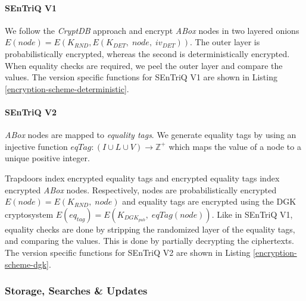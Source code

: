 %

\paragraph*{SEnTriQ V1} We follow the \emph{CryptDB} \autocite{Popa2011-zb, Popa2012-bw, Popa2011-ci} approach and encrypt \emph{ABox} nodes in two layered onions $E(node) = E(K_{RND}, E(K_{DET}, \; node, \; iv_{DET}))$. The outer layer is probabilistically encrypted, whereas the second is deterministically encrypted. When equality checks are required, we peel the outer layer and compare the values. The version specific functions for \gls{SEnTriQ} V1 are shown in Listing \ref{encryption-scheme-deterministic}.

%

\paragraph*{SEnTriQ V2} \emph{ABox} nodes are mapped to \emph{equality tags}. We generate equality tags by using an injective function $eqTag: (I \cup L \cup V) \rightarrow \mathbb{Z}^{+}$ which maps the value of a node to a unique positive integer.

Trapdoors index encrypted equality tags and encrypted equality tags index encrypted \emph{ABox} nodes. Respectively, nodes are probabilistically encrypted $E(node) = E(K_{RND}, \; node )$ and equality tags are encrypted using the \gls{DGK} cryptosystem \autocite{Damgard2007-km, Damgard2009-my, Franz2011-sm, Makkes2010-qb} $E(eq_{tag}) = E(K_{DGK_{pub}}, \; eqTag(node))$. Like in \gls{SEnTriQ} V1, equality checks are done by stripping the randomized layer of the equality tags, and comparing the values. This is done by partially decrypting the ciphertexts. The version specific functions for \gls{SEnTriQ} V2 are shown in Listing \ref{encryption-scheme-dgk}.

%

\subsubsection{Storage, Searches \& Updates} 

